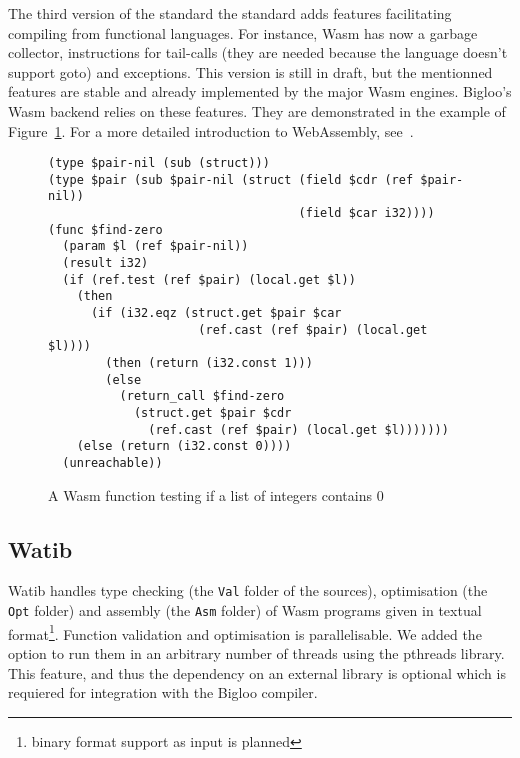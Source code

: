 \documentclass[a4paper,11pt]{article}
\begin{document}
The third version of the standard the standard adds features facilitating
compiling from functional languages. For instance, Wasm has now a garbage
collector, instructions for tail-calls (they are needed because the language
doesn't support goto) and exceptions. This version is still in draft, but the
mentionned features are stable and already implemented by the major Wasm
engines. Bigloo's Wasm backend relies on these features. They are demonstrated
in the example of Figure~\ref{ex}. For a more detailed introduction to
WebAssembly, see~\cite[Section~2.1]{phipps2023continuing}.

\begin{figure}[h]
  \begin{minipage}{\widthof{(type \$pair (sub \$pair-nil (struct (field \$cdr (ref \$pair-nil))}}
\begin{verbatim}
(type $pair-nil (sub (struct)))
(type $pair (sub $pair-nil (struct (field $cdr (ref $pair-nil))
                                   (field $car i32))))
(func $find-zero
  (param $l (ref $pair-nil))
  (result i32)
  (if (ref.test (ref $pair) (local.get $l))
    (then
      (if (i32.eqz (struct.get $pair $car
                     (ref.cast (ref $pair) (local.get $l))))
        (then (return (i32.const 1)))
        (else
          (return_call $find-zero
            (struct.get $pair $cdr
              (ref.cast (ref $pair) (local.get $l)))))))
    (else (return (i32.const 0))))
  (unreachable))
\end{verbatim}
  \end{minipage}

  \caption{A Wasm function testing if a list of integers contains 0}\label{ex}
\end{figure}

\subsection{Watib}
\textsf{Watib} handles type checking (the \texttt{Val} folder of the sources),
optimisation (the \texttt{Opt} folder) and assembly (the \texttt{Asm} folder) of
Wasm programs given in textual format\footnote{binary format support as input is
planned}. Function validation and optimisation is parallelisable. We added the
option to run them in an arbitrary number of threads using the \textsf{pthreads}
library. This feature, and thus the dependency on an external library is
optional which is requiered for integration with the Bigloo compiler.
\end{document}
